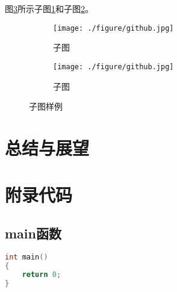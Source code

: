 \documentclass[winfonts,phd,twoside]{njuthesis}
\begin{document}
图\ref{fig:sub}所示子图\ref{subfig:a}和子图\ref{subfig:b}。
\begin{figure}[H]
	\begin{subfigure}{.5\textwidth}
		\centering
		\texttt{[image: ./figure/github.jpg]}
		\caption{子图}
		\label{subfig:a}
	\end{subfigure}
	\begin{subfigure}{.5\textwidth}
		\centering
		\texttt{[image: ./figure/github.jpg]}
		\caption{子图}
		\label{subfig:b}
	\end{subfigure}
\caption{子图样例}
\label{fig:sub}
\end{figure}

\chapter{总结与展望}
\lipsum[1]



\begin{acknowledgement}
\lipsum[1]

\end{acknowledgement}








\appendix
\chapter{附录代码}\label{app:1}
\section{main函数}
\begin{lstlisting}[language=C]
int main()
{
	return 0;
}
\end{lstlisting}
\end{document}
